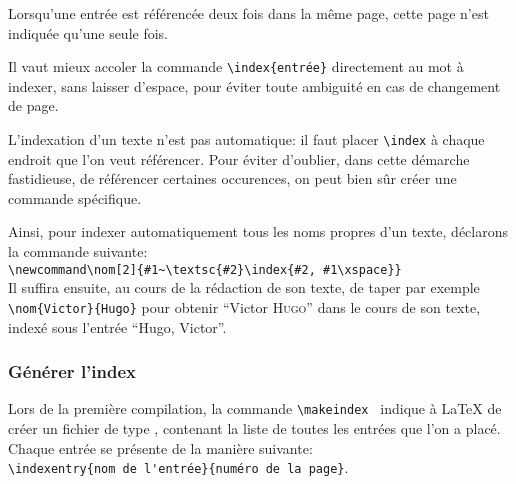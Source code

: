  Lorsqu'une entrée est référencée deux fois dans la même page, cette page n'est indiquée qu'une seule fois. 

\begin{attention}
Il vaut mieux accoler la commande \verb+\index{entrée}+ directement au  mot à indexer, sans laisser d'espace, pour éviter toute ambiguité en cas de changement de page.

\end{attention}

L'indexation d'un texte n'est pas automatique: il faut placer \verb+\index+ à chaque endroit  que l'on veut référencer. Pour éviter d'oublier, dans cette démarche fastidieuse, de référencer certaines occurences, on  peut bien sûr créer une commande  spécifique.

Ainsi, pour indexer automatiquement tous les noms propres d'un texte, déclarons la commande suivante:\\
 \verb+\newcommand\nom[2]{#1~\textsc{#2}\index{#2, #1\xspace}}+\\
Il suffira ensuite, au cours de la rédaction de son texte, de taper par exemple \verb|\nom{Victor}{Hugo}| pour obtenir \enquote{Victor \textsc{Hugo}} dans le cours de son texte, indexé sous l'entrée \enquote{Hugo, Victor}.


\subsubsection{Générer l'index}


 Lors de la première compilation, la commande \verb|\makeindex | indique à \LaTeX{} de créer un fichier de type , contenant la liste de toutes les entrées que l'on a placé. Chaque entrée se présente de la manière suivante:\\
\verb+\indexentry{nom de l'entrée}{numéro de la page}+.


